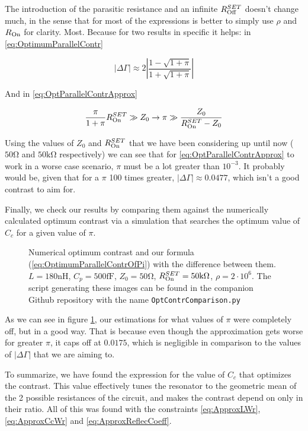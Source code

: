 \documentclass[../main.tex]{subfiles}
\begin{document}
The introduction of the parasitic resistance and an infinite \(R_{\text{Off}}^{SET}\)
doesn't change much, in the sense that for most of the expressions is better
to simply use \(\rho\) and \(R_{\text{On}}\) for clarity. Most. Because for two results
in specific it helps: in \ref{eq:OptimumParallelContr}

\begin{equation}
\label{eq:OptimumParallelContrOfPi}
    |\Delta\Gamma| \approx
                   2\left|
                   \frac{1 - \sqrt{1 + \pi}}{1 + \sqrt{1 + \pi}}
                   \right|
\end{equation}

And in \ref{eq:OptParallelContrApprox}

\begin{equation}
\label{eq:OptParallelContrApproxOfPi}
\frac{\pi}{1 + \pi}R_{\text{On}}^{SET} \gg Z_{0} \rightarrow
\pi \gg \frac{Z_{0}}{R_{\text{On}}^{SET} - Z_{0}}
\end{equation}

Using the values of \(Z_{0}\) and \(R_{\text{On}}^{SET}\) that we have been considering
up until now (\(50\unit{\ohm}\) and \(50\unit{\kilo\ohm}\) respectively) we can
see that for \ref{eq:OptParallelContrApprox} to work in a worse case scenario,
\(\pi\) must be a lot greater than \(10^{-3}\). It probably would
be, given that for a \(\pi\) 100 times greater,
\(|\Delta\Gamma| \approx 0.0477\), which isn't a good contrast to
aim for.

Finally, we check our results by comparing them against the numerically
calculated optimum contrast via a simulation that searches the optimum
value of \(C_{c}\) for a given value of \(\pi\).

\begin{figure}[t]
\centering
  
  \caption{Numerical optimum contrast and our formula (\ref{eq:OptimumParallelContrOfPi})
  with the difference between them.
\(L = 180\unit{\nano\henry}\), \(C_{p} = 500\unit{\femto\farad}\),
\(Z_{0} = 50\unit{\ohm}\), \(\ROn^{SET} = 50\unit{\kilo\ohm}\),
\(\rho = 2\cdot10^{6}\). The script generating these images can be found
in the companion Github repository with the name \texttt{OptContrComparison.py}}
\label{fig:ParallelContrComparison}
\end{figure}

As we can see in figure \ref{fig:ParallelContrComparison}, our
estimations for what values of \(\pi\) were completely off, but in a good way.
That is because even though the approximation gets worse for greater \(\pi\),
it caps off at \(0.0175\), which is negligible in comparison to the values of
\(|\Delta\Gamma|\) that we are aiming to.

To summarize, we have found the expression for the value of \(C_{c}\) that
optimizes the contrast. This value effectively tunes the resonator to the
geometric mean of the 2 possible resistances of the circuit, and makes
the contrast depend on only in their ratio. All of this was found with
the constraints \ref{eq:ApproxLWr}, \ref{eq:ApproxCcWr} and
\ref{eq:ApproxReflecCoeff}.
\end{document}

